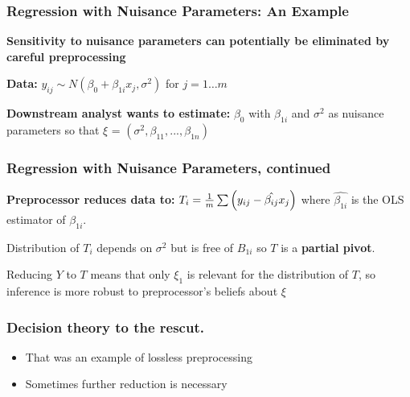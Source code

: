 \documentclass[10pt, compress]{beamer}
\begin{document}
\begin{frame}[fragile]

    \frametitle{Regression with Nuisance Parameters: An Example}
    
    \textbf{Sensitivity to nuisance parameters can potentially be eliminated by careful preprocessing}

    \vspace*{5mm}
    
    \textbf{Data:} $y_{ij} \sim N(\beta_0 + \beta_{1i}x_j, \sigma^2)$ for $j = 1 \ldots m$
    
    \textbf{Downstream analyst wants to estimate:} $\beta_0$ with $\beta_{1i}$ and $\sigma^2$ as nuisance parameters so that $\xi$ = $(\sigma^2, \beta_{11}, ..., \beta_{1n})$
    
\end{frame}

\begin{frame}[fragile]
    \frametitle{Regression with Nuisance Parameters, continued}
   
    \textbf{Preprocessor reduces data to:} $T_i = \frac{1}{m}\sum\del{y_{ij} - \hat{\beta_{ij}}x_j}$ where $\hat{\beta_{1i}}$ is the OLS estimator of $\beta_{1i}$.
    
    \vspace*{5mm}
    
    Distribution of $T_i$ depends on $\sigma^2$ but is free of $B_{1i}$ so $T$ is a \textbf{partial pivot}. 
    
    Reducing $Y$ to $T$ means that only $\xi_1$ is relevant for the distribution of $T$, so inference is more robust to preprocessor's beliefs about $\xi$
    
    
    
\end{frame}
\begin{frame}[fragile]
    \frametitle{Decision theory to the rescut.}
	\begin{itemize}
		\item That was an example of lossless preprocessing
		\item Sometimes further reduction is necessary
	\end{itemize}
\end{frame}
\end{document}
